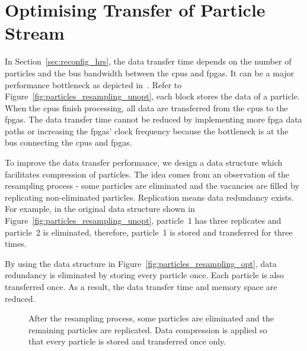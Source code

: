 \section{Optimising Transfer of Particle Stream}
\label{sec:reconfig_stream}

In Section~\ref{sec:reconfig_hrs}, the data transfer time depends on the number of particles and the bus bandwidth between the \gls{cpu}s and \gls{fpga}s.
It can be a major performance bottleneck as depicted in~\cite{chau13arc}.
Refer to Figure~\ref{fig:particles_resampling_unopt}, each block stores the data of a particle.
When the \gls{cpu}s finish processing, all data are transferred from the \gls{cpu}s to the \gls{fpga}s.
The data transfer time cannot be reduced by implementing more \gls{fpga} data paths or increasing the \gls{fpga}s' clock frequency because the bottleneck is at the bus connecting the \gls{cpu}s and \gls{fpga}s.

To improve the data transfer performance, we design a data structure which facilitates compression of particles.
The idea comes from an observation of the resampling process - some particles are eliminated and the vacancies are filled by replicating non-eliminated particles.
Replication means data redundancy exists.
For example, in the original data structure shown in Figure~\ref{fig:particles_resampling_unopt}, 
particle~1 has three replicates and particle~2 is eliminated, therefore, particle~1 is stored and transferred for three times.

By using the data structure in Figure~\ref{fig:particles_resampling_opt}, data redundancy is eliminated by storing every particle once.
Each particle is also transferred once.
As a result, the data transfer time and memory space are reduced.

\setcounter{subfigure}{0}
\begin{figure}[t!]
\centering
{}
\caption{After the resampling process, some particles are eliminated and the remaining particles are replicated. Data compression is applied so that every particle is stored and transferred once only.}
\label{fig:particles_resampling}
\end{figure}

